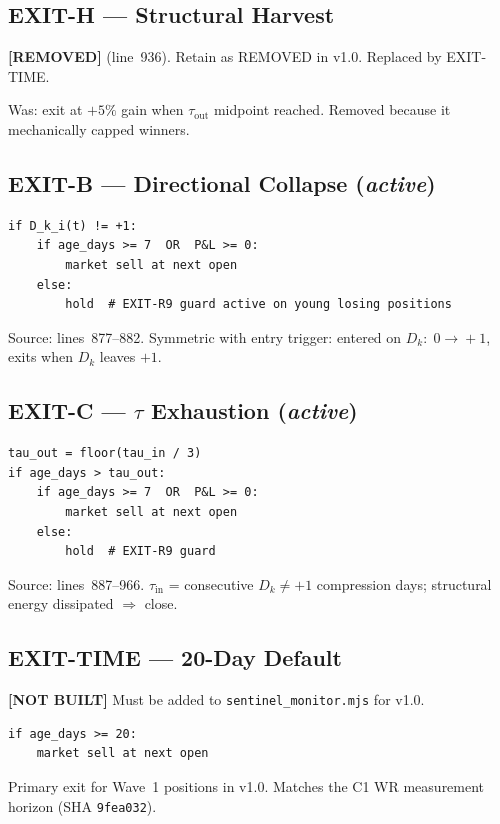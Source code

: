 \documentclass[11pt,a4paper]{article}
\newcommand{\statusnotbuilt}{\textcolor{statusnotbuilt}{\textbf{[NOT BUILT]}}}
\newcommand{\statusremoved}{\textcolor{statusnotbuilt}{\textbf{[REMOVED]}}}
\newcommand{\sha}[1]{\texttt{\footnotesize#1}}
\begin{document}
\subsection{EXIT-H — Structural Harvest}

\statusremoved{} (line~936). Retain as REMOVED in v1.0. Replaced by EXIT-TIME.

Was: exit at $+5\%$ gain when $\tau_{\text{out}}$ midpoint reached. Removed because it mechanically capped winners.

\subsection{EXIT-B — Directional Collapse (\emph{active})}

\begin{lstlisting}
if D_k_i(t) != +1:
    if age_days >= 7  OR  P&L >= 0:
        market sell at next open
    else:
        hold  # EXIT-R9 guard active on young losing positions
\end{lstlisting}

Source: lines~877--882. Symmetric with entry trigger: entered on $D_k{:}\;0\!\to\!+1$, exits when $D_k$ leaves $+1$.

\subsection{EXIT-C — $\tau$ Exhaustion (\emph{active})}

\begin{lstlisting}
tau_out = floor(tau_in / 3)
if age_days > tau_out:
    if age_days >= 7  OR  P&L >= 0:
        market sell at next open
    else:
        hold  # EXIT-R9 guard
\end{lstlisting}

Source: lines~887--966. $\tau_{\text{in}}$ = consecutive $D_k\neq+1$ compression days; structural energy dissipated $\Rightarrow$ close.

\subsection{EXIT-TIME — 20-Day Default}

\statusnotbuilt{} Must be added to \texttt{sentinel\_monitor.mjs} for v1.0.

\begin{lstlisting}
if age_days >= 20:
    market sell at next open
\end{lstlisting}

Primary exit for Wave~1 positions in v1.0. Matches the C1 WR measurement horizon (SHA \sha{9fea032}).
\end{document}
